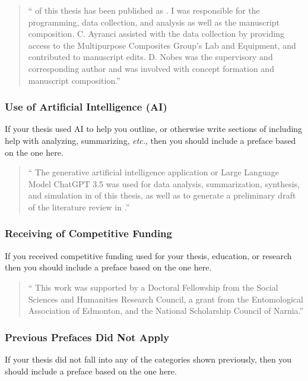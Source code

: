 				\begin{quote}
					\enquote{%
						 of this thesis has been published as . 
						I was responsible for the programming, data collection, and analysis as well as the manuscript composition. C. Ayranci assisted with the data collection by providing access to the Multipurpose Composites Group's Lab and Equipment, and contributed to manuscript edits. D. Nobes was the supervisory and corresponding author and was involved with concept formation and manuscript composition.}
				\end{quote}

			\subsubsection{Use of Artificial Intelligence (AI)}
				If your thesis used AI to help you outline, or otherwise write sections of including help with analyzing, summarizing, \textit{etc.}, then you should include a preface based on the one here.

				\begin{quote}
					\enquote{%
						The generative artificial intelligence application or Large Language Model ChatGPT 3.5 was used for data analysis, summarization, synthesis, and simulation in  of this thesis, as well as to generate a preliminary draft of the literature review in .}
				\end{quote}
				
			\subsubsection{Receiving of Competitive Funding}
				If you received competitive funding used for your thesis, education, or research then you should include a preface based on the one here.

				\begin{quote}
					\enquote{%
						This work was supported by a Doctoral Fellowship from the Social Sciences and Humanities Research Council, a grant from the Entomological Association of Edmonton, and the National Scholarship Council of Narnia.}
				\end{quote}
				
			\subsubsection{Previous Prefaces Did Not Apply}\label{sssec:preface}
				If your thesis did not fall into any of the categories shown previously, then you should include a preface based on the one here.


